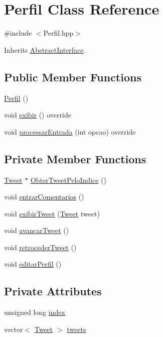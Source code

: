 \hypertarget{class_perfil}{}\section{Perfil Class Reference}
\label{class_perfil}


{\ttfamily \#include $<$Perfil.\+hpp$>$}



Inherits \hyperlink{class_abstract_interface}{Abstract\+Interface}.

\subsection*{Public Member Functions}
\begin{DoxyCompactItemize}
\item 
\hyperlink{class_perfil_a7d33c31b4d676edb7d5e5ff2905ce0c0}{Perfil} ()
\item 
void \hyperlink{class_perfil_a877aaf12fcb8e429244f4754bc2657e0}{exibir} () override
\item 
void \hyperlink{class_perfil_ad6a7cb27685c99b2660851819dc69b8f}{processar\+Entrada} (int opcao) override
\end{DoxyCompactItemize}
\subsection*{Private Member Functions}
\begin{DoxyCompactItemize}
\item 
\hyperlink{class_tweet}{Tweet} $\ast$ \hyperlink{class_perfil_a7f3c421a5476419f60937e3dc9c99ccd}{Obter\+Tweet\+Pelo\+Indice} ()
\item 
void \hyperlink{class_perfil_a6547bb296776ad129411994a8ad31a1e}{entrar\+Comentarios} ()
\item 
void \hyperlink{class_perfil_a3eae1bc156b75d15bd8eb260e3329022}{exibir\+Tweet} (\hyperlink{class_tweet}{Tweet} tweet)
\item 
void \hyperlink{class_perfil_a2f8d3a23b664c3457ddd70b3f3857f2b}{avancar\+Tweet} ()
\item 
void \hyperlink{class_perfil_a4773ccaa4dee6f040e893935ea2073e9}{retroceder\+Tweet} ()
\item 
void \hyperlink{class_perfil_ad20877ec0e6a0d44bd3ec97c216335b0}{editar\+Perfil} ()
\end{DoxyCompactItemize}
\subsection*{Private Attributes}
\begin{DoxyCompactItemize}
\item 
unsigned long \hyperlink{class_perfil_a532aa01a2dddba12cc73cc79942e3d4f}{index}
\item 
vector$<$ \hyperlink{class_tweet}{Tweet} $>$ \hyperlink{class_perfil_a8aec470bb6a319be9a3bf65795f825d7}{tweets}
\end{DoxyCompactItemize}


